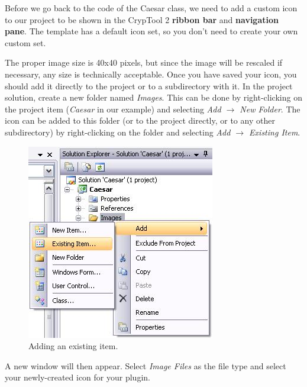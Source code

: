 Before we go back to the code of the Caesar class, we need to add a custom icon to our project to be shown in the CrypTool 2 \textbf{ribbon bar} and \textbf{navigation pane}. The template has a default icon set, so you don't need to create your own custom set.

The proper image size is 40x40 pixels, but since the image will be rescaled if necessary, any size is technically acceptable. Once you have saved your icon, you should add it directly to the project or to a subdirectory with it. In the project solution, create a new folder named \textit{Images}. This can be done by right-clicking on the project item (\textit{Caesar} in our example) and selecting \textit{Add $\rightarrow$ New Folder}. The icon can be added to this folder (or to the project directly, or to any other subdirectory) by right-clicking on the folder and selecting \textit{Add $\rightarrow$ Existing Item}.

\begin{figure}[h!]
	\centering
		\includegraphics{figures/add_existing_item.jpg}
	\caption{Adding an existing item.}
	\label{fig:add_existing_item}
\end{figure}
\clearpage

A new window will then appear. Select \textit{Image Files} as the file type and select your newly-created icon for your plugin.

